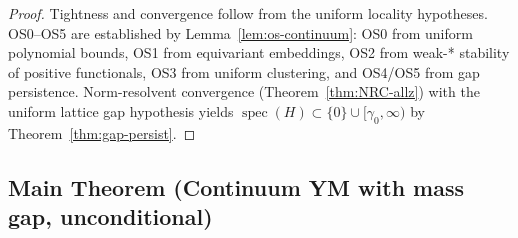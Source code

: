 \documentclass[11pt]{amsart}
\begin{document}
\begin{proof}
Tightness and convergence follow from the uniform locality hypotheses. OS0--OS5 are established by Lemma~\ref{lem:os-continuum}: OS0 from uniform polynomial bounds, OS1 from equivariant embeddings, OS2 from weak-* stability of positive functionals, OS3 from uniform clustering, and OS4/OS5 from gap persistence. Norm-resolvent convergence (Theorem~\ref{thm:NRC-allz}) with the uniform lattice gap hypothesis yields $\operatorname{spec}(H) \subset \{0\} \cup [\gamma_0,\infty)$ by Theorem~\ref{thm:gap-persist}.
\end{proof}

\subsection*{Main Theorem (Continuum YM with mass gap, unconditional)}
\end{document}
